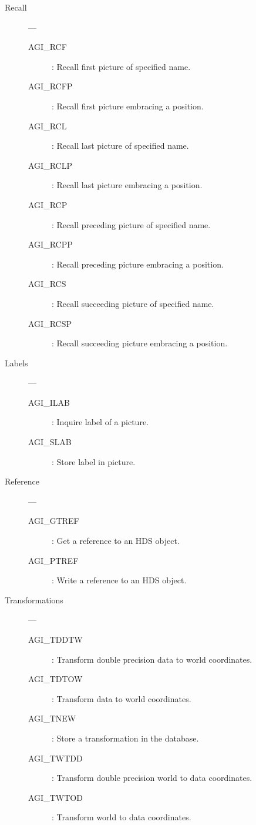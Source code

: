 \begin{description}
\item [Recall] ---

\begin{description}
\item [AGI\_RCF] : Recall first picture of specified name.
\item [AGI\_RCFP] : Recall first picture embracing a position.
\item [AGI\_RCL] : Recall last picture of specified name.
\item [AGI\_RCLP] : Recall last picture embracing a position.
\item [AGI\_RCP] : Recall preceding picture of specified name.
\item [AGI\_RCPP] : Recall preceding picture embracing a position.
\item [AGI\_RCS] : Recall succeeding picture of specified name.
\item [AGI\_RCSP] : Recall succeeding picture embracing a position.
\end{description}

\item [Labels] ---

\begin{description}
\item [AGI\_ILAB] : Inquire label of a picture.
\item [AGI\_SLAB] : Store label in picture.
\end{description}

\item [Reference] ---

\begin{description}
\item [AGI\_GTREF] : Get a reference to an HDS object.
\item [AGI\_PTREF] : Write a reference to an HDS object.
\end{description}

\item [Transformations] ---

\begin{description}
\item [AGI\_TDDTW] : Transform double precision data to world coordinates.
\item [AGI\_TDTOW] : Transform data to world coordinates.
\item [AGI\_TNEW] : Store a transformation in the database.
\item [AGI\_TWTDD] : Transform double precision world to data coordinates.
\item [AGI\_TWTOD] : Transform world to data coordinates.
\end{description}


\end{description}
